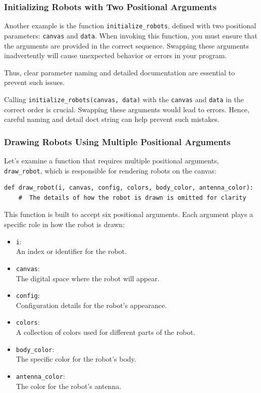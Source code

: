 \subsubsection{Initializing Robots with Two Positional Arguments}

Another example is the function \texttt{initialize\_robots}, defined with two positional parameters: \texttt{canvas} and \texttt{data}.
When invoking this function, you must ensure that the arguments are provided in the correct sequence. Swapping these arguments inadvertently will cause unexpected behavior or errors in your program.

Thus, clear parameter naming and detailed documentation are essential to prevent such issues.



Calling \texttt{initialize\_robots(canvas, data)} with the \texttt{canvas} and \texttt{data} in the correct order is crucial. Swapping these arguments would lead to errors. Hence, careful naming and detail doct string can help prevent such mistakes.

\subsubsection{ Drawing Robots Using Multiple Positional Arguments}

Let's examine a function that requires multiple positional arguments, \texttt{draw\_robot}, which is responsible for rendering robots on the canvas:
\begin{verbatim}
def draw_robot(i, canvas, config, colors, body_color, antenna_color):
    #  The details of how the robot is drawn is omitted for clarity
\end{verbatim}
This function is built to accept six positional arguments. Each argument plays a specific role in how the robot is drawn:
\begin{itemize}\setlength{\itemsep}{0pt}
    \item \texttt{i}: \\ An index or identifier for the robot.
    \item \texttt{canvas}: \\  The digital space where the robot will appear.
    \item \texttt{config}: \\ Configuration details for the robot's appearance.
    \item \texttt{colors}: \\  A collection of colors used for different parts of the robot.
    \item \texttt{body\_color}: \\  The specific color for the robot's body.
    \item \texttt{antenna\_color}: \\ The color for the robot's antenna.
\end{itemize}

